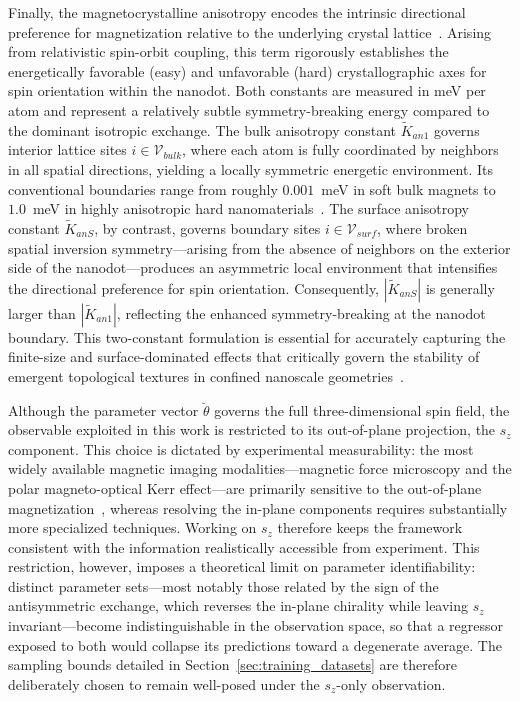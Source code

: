 \documentclass[letterpaper, 12, one column]{article}
\begin{document}
Finally, the magnetocrystalline anisotropy encodes the intrinsic directional preference for magnetization relative to the underlying crystal lattice~\cite{cullity2011introduction}. Arising from 
relativistic spin-orbit coupling, this term rigorously establishes the energetically favorable (easy) and unfavorable (hard) crystallographic axes for spin orientation within the nanodot. Both constants are measured in meV per atom and represent a relatively subtle symmetry-breaking energy compared to the dominant isotropic 
exchange. The bulk anisotropy constant $\tilde{K}_{an1}$ governs interior lattice sites $i \in \mathcal{V}_{bulk}$, where each atom is fully coordinated by neighbors in all spatial directions, yielding a locally symmetric energetic environment. Its conventional boundaries range from roughly $0.001$~meV in soft bulk magnets to $1.0$~meV in 
highly anisotropic hard nanomaterials~\cite{cullity2011introduction}. The surface anisotropy constant $\tilde{K}_{anS}$, by contrast, 
governs boundary sites $i \in \mathcal{V}_{surf}$, where broken spatial inversion symmetry---arising from the absence of neighbors on the exterior side of the nanodot---produces an asymmetric local environment that intensifies the directional preference for spin orientation. Consequently, $|\tilde{K}_{anS}|$ is generally larger than $|\tilde{K}_{an1}|$, reflecting the enhanced symmetry-breaking at the nanodot boundary. This two-constant formulation is essential for accurately capturing the finite-size and surface-dominated effects that critically govern the stability of emergent topological textures
in confined nanoscale geometries~\cite{fert2024electrical,borisov2021heisenberg}.

Although the parameter vector $\breve{\theta}$ governs the full three-dimensional spin field, the observable exploited in this work is restricted to its out-of-plane projection, the $s_z$ component. This choice is dictated by experimental measurability: the most widely available magnetic imaging modalities---magnetic force microscopy and the polar magneto-optical Kerr effect---are primarily sensitive to the out-of-plane magnetization~\cite{li2023skyrmions}, whereas resolving the in-plane components requires substantially more specialized techniques. Working on $s_z$ therefore keeps the framework consistent with the information realistically accessible from experiment. This restriction, however, imposes a theoretical limit on parameter identifiability: distinct parameter sets---most notably those related by the sign of the antisymmetric exchange, which reverses the in-plane chirality while leaving $s_z$ invariant---become indistinguishable in the observation space, so that a regressor exposed to both would collapse its predictions toward a degenerate average. The sampling bounds detailed in Section~\ref{sec:training_datasets} are therefore deliberately chosen to remain well-posed under the $s_z$-only observation.
\end{document}
